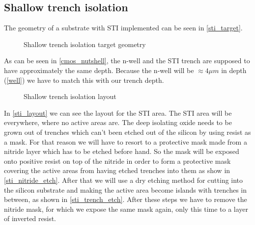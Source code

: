 \subsection{Shallow trench isolation}\label{sti}
The geometry of a substrate with STI implemented can be seen in \autoref{sti_target}.

\begin{figure}[H]
	\centering
	\begin{tikzpicture}[node distance = 3cm, auto, thick,scale=\CrossAndTopSectionBig, every node/.style={transform shape}]
		
	\end{tikzpicture}
	\begin{tikzpicture}[node distance = 3cm, auto, thick,scale=\CrossAndTopSectionBig, every node/.style={transform shape}]
		
	\end{tikzpicture}
	\caption{Shallow trench isolation target geometry}
	\label{sti_target}
\end{figure}

As can be seen in \autoref{cmos_nutshell}, the n-well and the STI trench are supposed to have approximately the same depth.
Because the n-well will be $\approx 4 \mu m$ in depth (\autoref{well}) we have to match this with our trench depth.

\begin{figure}[H]
	\centering
	\begin{tikzpicture}[node distance =1cm, auto, thick,scale=\VLSILayout, every node/.style={transform shape}]
		
	\end{tikzpicture}
	\caption{Shallow trench isolation layout}
	\label{sti_layout}
\end{figure}

In \autoref{sti_layout} we can see the layout for the STI area.
The STI area will be everywhere, where no active areas are.
The deep isolating oxide needs to be grown out of trenches which can't been etched out of the silicon by using resist as a mask.
For that reason we will have to resort to a protective mask made from a nitride layer which has to be etched before hand.
So the mask will be exposed onto positive resist on top of the nitride in order to form a protective mask covering the active areas from having etched trenches into them as show in \autoref{sti_nitride_etch}.
After that we will use a dry etching method for cutting into the silicon substrate and making the active area become islands with trenches in between, as shown in \autoref{sti_trench_etch}.
After these steps we have to remove the nitride mask, for which we expose the same mask again, only this time to a layer of inverted resist.

